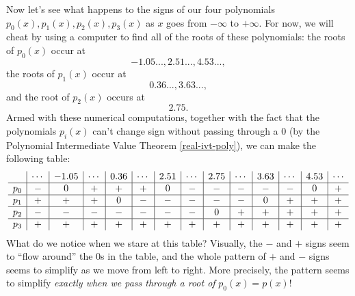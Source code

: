 Now let's see what happens to the signs of our four polynomials $p_0(x), p_1(x), p_2(x), p_3(x)$ as $x$ goes from $-\infty$ to $+\infty$. For now, we will cheat by using a computer to find all of the roots of these polynomials: the roots of $p_0(x)$ occur at
\[
-1.05..., 2.51..., 4.53...,
\]
the roots of $p_1(x)$ occur at
\[
0.36..., 3.63...,
\]
and the root of $p_2(x)$ occurs at
\[
2.75.
\]
Armed with these numerical computations, together with the fact that the polynomials $p_i(x)$ can't change sign without passing through a $0$ (by the Polynomial Intermediate Value Theorem \ref{real-ivt-poly}), we can make the following table:
\[
\begin{array}{c | c | c | c | c | c | c | c | c | c | c | c | c | c}
 & \cdots & -1.05 & \cdots & 0.36 & \cdots & 2.51 & \cdots & 2.75 & \cdots & 3.63 & \cdots & 4.53 & \cdots\\
\hline
p_0 & - & 0 & + & + & + & 0 & - & - & - & - & - & 0 & +\\
\hline
p_1 & + & + & + & 0 & - & - & - & - & - & 0 & + & + & +\\
\hline
p_2 & - & - & - & - & - & - & - & 0 & + & + & + & + & +\\
\hline
p_3 & + & + & + & + & + & + & + & + & + & + & + & + & +
\end{array}
\]
What do we notice when we stare at this table? Visually, the $-$ and $+$ signs seem to ``flow around'' the $0$s in the table, and the whole pattern of $+$ and $-$ signs seems to simplify as we move from left to right. More precisely, the pattern seems to simplify \emph{exactly when we pass through a root of } $p_0(x) = p(x)$!

